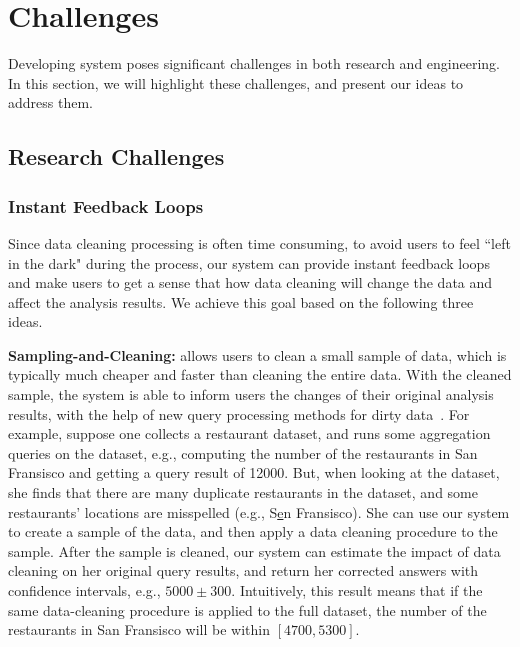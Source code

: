\section{Challenges}
Developing \projx system poses significant challenges in both research and engineering. In this section, we will highlight these challenges, and present our ideas to address them.

\subsection{Research Challenges}



\subsubsection{Instant Feedback Loops}

Since data cleaning processing is often time consuming, to avoid users to feel ``left in the dark" during the process, our system can provide instant feedback loops and make users to get a sense that how data cleaning will change the data and affect the analysis results. We achieve this goal based on the following three ideas. 

\vspace{.5em}

{\noindent \bf Sampling-and-Cleaning:} \projx allows users to clean a small sample of data, which is typically much cheaper and faster than cleaning the entire data. With the cleaned sample, the system is able to inform users the changes of their original analysis results, with the help of new query processing methods for dirty data~\cite{wang1999sample}. For example, suppose one collects a restaurant dataset, and runs some aggregation queries on the dataset, e.g., computing the number of the restaurants in San Fransisco and getting a query result of 12000. But, when looking at the dataset, she finds that there are many duplicate restaurants in the dataset, and some restaurants' locations are misspelled (e.g., S\underline{e}n Fransisco). She can use our system to create a sample of the data, and then apply a data cleaning procedure to the sample. After the sample is cleaned, our system can estimate the impact of data cleaning on her original query results, and return her corrected answers with confidence intervals, e.g., $5000\pm300$. Intuitively, this result means that if the same data-cleaning procedure is applied to the full dataset, the number of the restaurants in San Fransisco will be within $[4700, 5300]$. 

